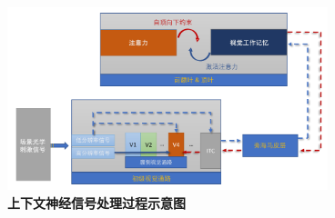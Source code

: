 \begin{figure}[htbp]
	\centering
	\includegraphics[width=0.83\textwidth]{chapters/ch2_figs/Neural_workflow}	%
	\caption{\textbf{上下文神经信号处理过程示意图}}
	\label{fig:2_2}      
\end{figure}